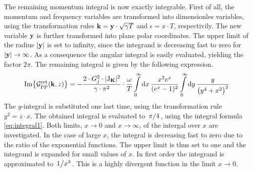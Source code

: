 The remaining momentum integral is now exactly integrable.
First of all, the momentum and frequency variables are transformed into dimensionles variables, using the transformation rules $\vb{k} = \vb{y} \cdot \sqrt{\gamma T}$ and $\epsilon = x \cdot T$, respectivily.
The new variable $\vb{y}$ is further transformed into plane polar coordinates.
The upper limit of the radius $|\vb{y}|$ is set to infinity, since the integrand is decreasing fast to zero for $|\vb{y}| \to \infty$.
As a consequence the angular integral is easily evaluated, yielding the factor $2\pi$.
The remaining integral is given by the following expression.
%
\begin{align}
	\Im{\mathcal{G}_{\dot{\mathrm{P}}\dot{\mathrm{P}}}^{\mathrm{ret}}(\vb{k}, z)} = 
		 -\frac{2 \cdot G_{j}^{2} \cdot \vert \mathrm{J}_{\vb{K}} \vert^{2}}{\gamma \cdot \pi^{2}} \cdot \frac{\omega}{T}
		\int\limits_{0}^{\infty} \dd{x}
		\frac{x^{2} e^{x}}{(e^{x} - 1)^{2}}
		\int\limits_{0}^{\infty} \dd{y}
		\frac{y}{\big(y^{4} + x^{2}\big)^{2}}
\end{align}
%
The $y$-integral is substituted one last time, using the transformation rule $y^{2} = z \cdot x$.
The obtained integral is evaluated to $\flatfrac{\pi}{4}$, using the integral formula \eqref{eq:integral1}.
Both limits, $x \to 0$ and $x \to \infty$, of the intergal over $x$ are investigated.
In the case of large $x$, the integral is decreasing fast to zero due to the ratio of the exponential functions.
The upper limit is thus set to one and the integrand is expanded for small values of $x$.
In first order the integrand is approximated to $\flatfrac{1}{x^{3}}$.
This is a highly divergent function in the limit $x \to 0$.











































